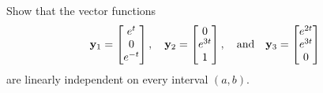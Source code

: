 \documentclass{ximera}
\begin{document}
\begin{example}\label{example:10.3.1}
Show that the vector functions
$$
{\bf y}_1=\begin{bmatrix}e^t\\0\\e^{-t}\end{bmatrix},\quad
{\bf
y}_2=\begin{bmatrix}0\\e^{3t}\\1\end{bmatrix},
\quad\mbox{and}\quad{\bf
y}_3=\begin{bmatrix}e^{2t}\\e^{3t}\\0\end{bmatrix}
$$
are linearly independent on every interval  $(a,b)$.



\end{example}
\end{document}
